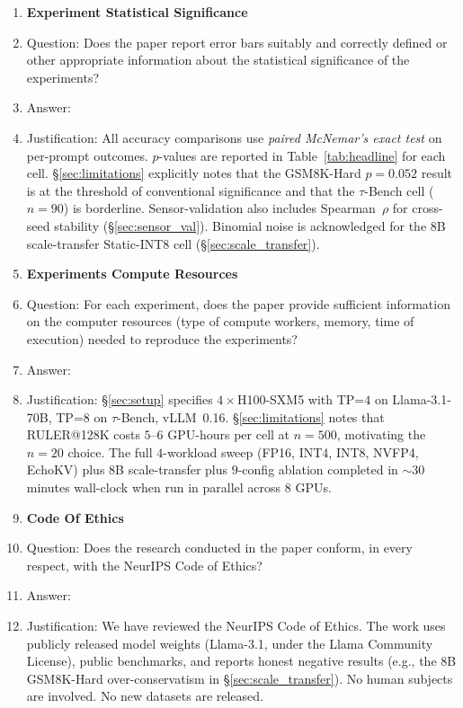 \documentclass{article}
\begin{document}
\begin{enumerate}
\item {\bf Experiment Statistical Significance}
\item[] Question: Does the paper report error bars suitably and correctly defined or other appropriate information about the statistical significance of the experiments?
\item[] Answer: \answerYes{}
\item[] Justification: All accuracy comparisons use \emph{paired McNemar's exact test} on per-prompt outcomes. $p$-values are reported in Table~\ref{tab:headline} for each cell. \S\ref{sec:limitations} explicitly notes that the GSM8K-Hard $p{=}0.052$ result is at the threshold of conventional significance and that the $\tau$-Bench cell ($n{=}90$) is borderline. Sensor-validation also includes Spearman~$\rho$ for cross-seed stability (\S\ref{sec:sensor_val}). Binomial noise is acknowledged for the 8B scale-transfer Static-INT8 cell (\S\ref{sec:scale_transfer}).

\item {\bf Experiments Compute Resources}
\item[] Question: For each experiment, does the paper provide sufficient information on the computer resources (type of compute workers, memory, time of execution) needed to reproduce the experiments?
\item[] Answer: \answerYes{}
\item[] Justification: \S\ref{sec:setup} specifies $4{\times}$H100-SXM5 with TP=$4$ on Llama-3.1-70B, TP=$8$ on $\tau$-Bench, vLLM~0.16. \S\ref{sec:limitations} notes that RULER@128K costs $5$--$6$ GPU-hours per cell at $n{=}500$, motivating the $n{=}20$ choice. The full $4$-workload sweep (FP16, INT4, INT8, NVFP4, EchoKV) plus 8B scale-transfer plus $9$-config ablation completed in ${\sim}30$ minutes wall-clock when run in parallel across $8$ GPUs.

\item {\bf Code Of Ethics}
\item[] Question: Does the research conducted in the paper conform, in every respect, with the NeurIPS Code of Ethics?
\item[] Answer: \answerYes{}
\item[] Justification: We have reviewed the NeurIPS Code of Ethics. The work uses publicly released model weights (Llama-3.1, under the Llama Community License), public benchmarks, and reports honest negative results (e.g., the 8B GSM8K-Hard over-conservatism in \S\ref{sec:scale_transfer}). No human subjects are involved. No new datasets are released.


\end{enumerate}
\end{document}

